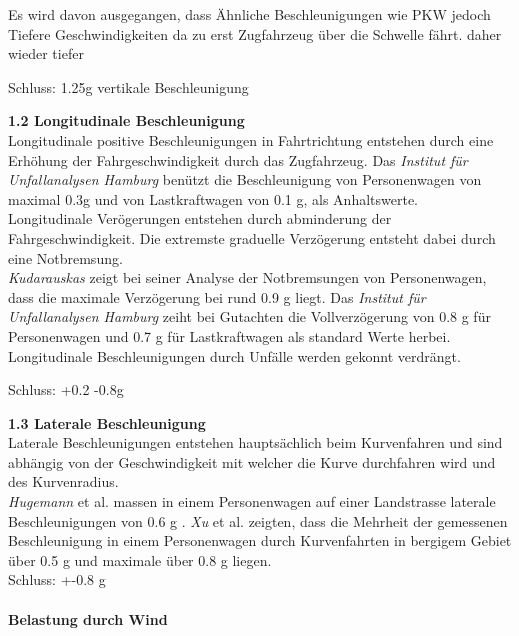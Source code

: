 \begin{description}
    Es wird davon ausgegangen, dass
    Ähnliche Beschleunigungen wie PKW
    jedoch Tiefere Geschwindigkeiten da zu erst Zugfahrzeug über die Schwelle fährt.
    daher wieder tiefer

    Schluss: 1.25g vertikale Beschleunigung

    \item \textbf{1.2 Longitudinale Beschleunigung}\\
    Longitudinale positive Beschleunigungen in Fahrtrichtung entstehen durch eine Erhöhung der Fahrgeschwindigkeit durch das Zugfahrzeug. Das \emph{Institut für Unfallanalysen Hamburg} \cite{Verz.3} benützt die Beschleunigung von Personenwagen von maximal 0.3g und von Lastkraftwagen von 0.1 g, als Anhaltswerte. \\

    Longitudinale Verögerungen entstehen durch abminderung der Fahrgeschwindigkeit. Die extremste graduelle Verzögerung entsteht dabei durch eine Notbremsung.\\
    \emph{Kudarauskas} \cite{Verz.1} zeigt bei seiner Analyse der Notbremsungen von Personenwagen, dass die maximale Verzögerung bei rund 0.9 g liegt. Das \emph{Institut für Unfallanalysen Hamburg} \cite{Verz.2} zeiht bei Gutachten die Vollverzögerung von 0.8 g für Personenwagen und 0.7 g für Lastkraftwagen als standard Werte herbei. \\

    Longitudinale Beschleunigungen durch Unfälle werden gekonnt verdrängt.

    Schluss: +0.2 -0.8g

    \item \textbf{1.3 Laterale Beschleunigung}\\
    Laterale Beschleunigungen entstehen hauptsächlich beim Kurvenfahren und sind abhängig von der Geschwindigkeit mit welcher die Kurve durchfahren wird und des Kurvenradius.\\
    \emph{Hugemann} et al. \cite{Kurv.1} massen in einem Personenwagen auf einer Landstrasse laterale Beschleunigungen von 0.6 g . \emph{Xu} et al. \cite{Kurv.2} zeigten, dass die Mehrheit der gemessenen Beschleunigung in einem Personenwagen durch Kurvenfahrten in bergigem Gebiet über 0.5 g und maximale über 0.8 g liegen.\\

    Schluss: +-0.8 g
  \end{description}

  \paragraph{Belastung durch Wind}

